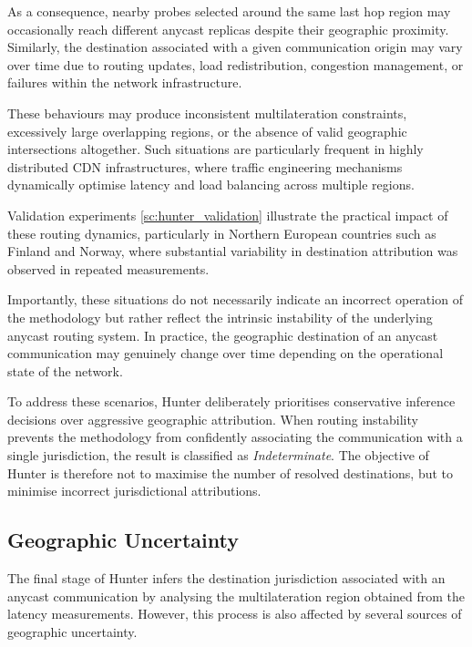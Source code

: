 \documentclass[
A4paper,                %
twoside,                %
openright,              %
chapterprefix=true,     %
12pt,                   %
headings=normal,        %
titlepage=on            %
]{book}
\begin{document}
As a consequence, nearby probes selected around the same last hop region may occasionally reach different anycast replicas despite their geographic proximity. Similarly, the destination associated with a given communication origin may vary over time due to routing updates, load redistribution, congestion management, or failures within the network infrastructure.

These behaviours may produce inconsistent multilateration constraints, excessively large overlapping regions, or the absence of valid geographic intersections altogether. Such situations are particularly frequent in highly distributed CDN infrastructures, where traffic engineering mechanisms dynamically optimise latency and load balancing across multiple regions.

Validation experiments \ref{sc:hunter_validation} illustrate the practical impact of these routing dynamics, particularly in Northern European countries such as Finland and Norway, where substantial variability in destination attribution was observed in repeated measurements.

Importantly, these situations do not necessarily indicate an incorrect operation of the methodology but rather reflect the intrinsic instability of the underlying anycast routing system. In practice, the geographic destination of an anycast communication may genuinely change over time depending on the operational state of the network.

To address these scenarios, Hunter deliberately prioritises conservative inference decisions over aggressive geographic attribution. When routing instability prevents the methodology from confidently associating the communication with a single jurisdiction, the result is classified as \textit{Indeterminate}. The objective of Hunter is therefore not to maximise the number of resolved destinations, but to minimise incorrect jurisdictional attributions.

\subsection{Geographic Uncertainty}
\label{sc:hunter_limitations_geographic_uncertainty}

The final stage of Hunter infers the destination jurisdiction associated with an anycast communication by analysing the multilateration region obtained from the latency measurements. However, this process is also affected by several sources of geographic uncertainty.
\end{document}
